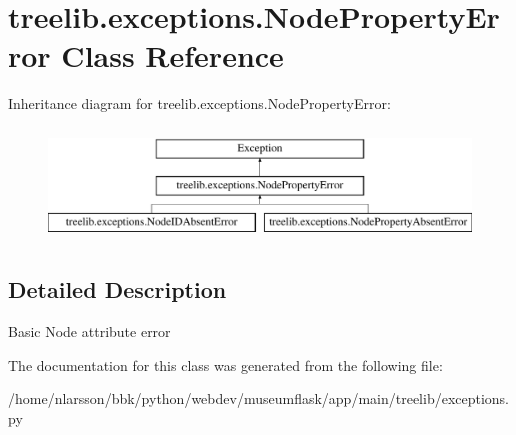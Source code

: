 \hypertarget{classtreelib_1_1exceptions_1_1NodePropertyError}{}\section{treelib.\+exceptions.\+Node\+Property\+Error Class Reference}
\label{classtreelib_1_1exceptions_1_1NodePropertyError}
Inheritance diagram for treelib.\+exceptions.\+Node\+Property\+Error\+:\begin{figure}[H]
\begin{center}
\leavevmode
\includegraphics[height=3.000000cm]{classtreelib_1_1exceptions_1_1NodePropertyError}
\end{center}
\end{figure}


\subsection{Detailed Description}
\begin{DoxyVerb}Basic Node attribute error\end{DoxyVerb}
 

The documentation for this class was generated from the following file\+:\begin{DoxyCompactItemize}
\item 
/home/nlarsson/bbk/python/webdev/museumflask/app/main/treelib/exceptions.\+py\end{DoxyCompactItemize}
